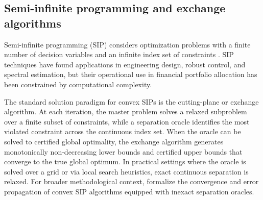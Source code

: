 \documentclass[smallextended]{svjour3}
\begin{document}
\subsection{Semi-infinite programming and exchange algorithms}
Semi-infinite programming (SIP) considers optimization problems with a finite number of decision variables and an infinite index set of constraints \citep{hettich1993semi, lopez2007semi}. SIP techniques have found applications in engineering design, robust control, and spectral estimation, but their operational use in financial portfolio allocation has been constrained by computational complexity.

The standard solution paradigm for convex SIPs is the cutting-plane or exchange algorithm. At each iteration, the master problem solves a relaxed subproblem over a finite subset of constraints, while a separation oracle identifies the most violated constraint across the continuous index set. When the oracle can be solved to certified global optimality, the exchange algorithm generates monotonically non-decreasing lower bounds and certified upper bounds that converge to the true global optimum. In practical settings where the oracle is solved over a grid or via local search heuristics, exact continuous separation is relaxed. For broader methodological context, \citet{oustry2025convex} formalize the convergence and error propagation of convex SIP algorithms equipped with inexact separation oracles.


\begin{table}[htbp]
\centering
\caption{Comparison of conditional and robust risk models. For a formal structural comparison between standard Conditional DRO and the proposed continuous-state Robust SIP, see Equations \eqref{eq:dro_contrast} and \eqref{eq:sip_contrast}.}
\label{tab:lit_comparison}
\end{table}
\end{document}
